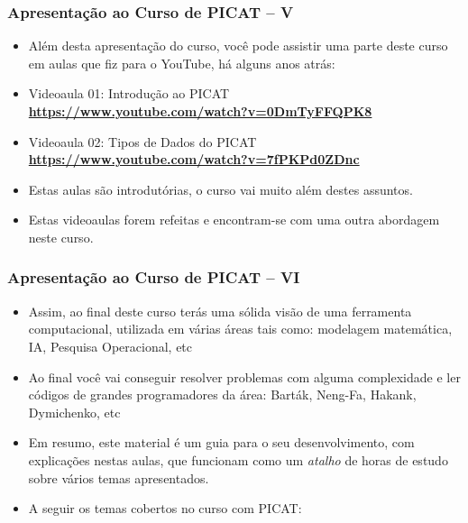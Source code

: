     
\begin{frame}[fragile]
  \frametitle{Apresentação ao Curso de PICAT -- V}
  \begin{itemize}

    \item Além desta  apresentação do curso, você pode assistir uma
    parte deste curso em aulas  que fiz para o YouTube, há alguns anos atrás:

    \pause
    \item Videoaula 01: Introdução ao PICAT\\
    \textbf{\url {https://www.youtube.com/watch?v=0DmTyFFQPK8}}

    \pause 
    \item Videoaula 02: Tipos de Dados do PICAT\\
    \textbf{\url {https://www.youtube.com/watch?v=7fPKPd0ZDnc}} 
    
    \item Estas aulas são introdutórias, o curso vai muito além destes
    assuntos.
    
    \pause 
    \item Estas videoaulas forem refeitas e  encontram-se com uma outra abordagem
    neste curso. 
    
  \end{itemize}

\end{frame}




\begin{frame}[fragile]
  \frametitle{Apresentação ao Curso de PICAT -- VI}
  \begin{itemize}

						
    \item Assim, ao final deste curso terás uma sólida visão  de uma ferramenta
    computacional, utilizada em várias áreas tais como: modelagem matemática, IA,
    Pesquisa Operacional, etc

    \pause
    \item Ao final você vai conseguir resolver problemas com alguma complexidade e ler
    códigos de grandes programadores da área: Barták, Neng-Fa, Hakank, Dymichenko, etc    
    
    \pause
		\item Em resumo, este material é  um guia para o seu desenvolvimento,
		 com explicações nestas aulas, que funcionam como um \textit{atalho} de
		 horas de estudo sobre vários temas apresentados.
   
    \pause
    \item A seguir os temas cobertos no curso com PICAT:
  \end{itemize}

\end{frame}


